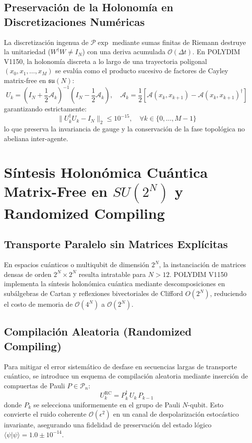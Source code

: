 \subsection{Preservación de la Holonomía en Discretizaciones Numéricas}
La discretización ingenua de $\mathcal{P}\exp$ mediante sumas finitas de Riemann destruye la unitariedad ($W^\dagger W \neq I_N$) con una deriva acumulada $\mathcal{O}(\Delta t)$. En POLYDIM V1150, la holonomía discreta a lo largo de una trayectoria poligonal $(x_0, x_1, \dots, x_M)$ se evalúa como el producto sucesivo de factores de Cayley matrix-free en $\mathfrak{su}(N)$:
\begin{equation}
U_k = \left( I_N + \frac{1}{2} \mathcal{A}_k \right)^{-1} \left( I_N - \frac{1}{2} \mathcal{A}_k \right), \quad \mathcal{A}_k = \frac{1}{2} \left[ \mathcal{A}(x_k, x_{k+1}) - \mathcal{A}(x_k, x_{k+1})^\dagger \right]
\end{equation}
garantizando estrictamente:
\begin{equation}
\|U_k^\dagger U_k - I_N\|_2 \le 10^{-15}, \quad \forall k \in \{0, \dots, M-1\}
\end{equation}
lo que preserva la invariancia de gauge y la conservación de la fase topológica no abeliana inter-agente.

\section{Síntesis Holonómica Cuántica Matrix-Free en $SU(2^N)$ y Randomized Compiling}
\subsection{Transporte Paralelo sin Matrices Explícitas}
En espacios cuánticos o multiqubit de dimensión $2^N$, la instanciación de matrices densas de orden $2^N \times 2^N$ resulta intratable para $N > 12$. POLYDIM V1150 implementa la síntesis holonómica cuántica mediante descomposiciones en subálgebras de Cartan y reflexiones bivectoriales de Clifford $O(2^N)$, reduciendo el costo de memoria de $\mathcal{O}(4^N)$ a $\mathcal{O}(2^N)$.

\subsection{Compilación Aleatoria (Randomized Compiling)}
Para mitigar el error sistemático de desfase en secuencias largas de transporte cuántico, se introduce un esquema de compilación aleatoria mediante inserción de compuertas de Pauli $P \in \mathcal{P}_n$:
\begin{equation}
U_k^{\text{RC}} = P_k^\dagger \, U_k \, P_{k-1}
\end{equation}
donde $P_k$ se selecciona uniformemente en el grupo de Pauli $N$-qubit. Esto convierte el ruido coherente $\mathcal{O}(\epsilon^2)$ en un canal de despolarización estocástico invariante, asegurando una fidelidad de preservación del estado lógico $\langle \psi | \psi \rangle = 1.0 \pm 10^{-14}$.

